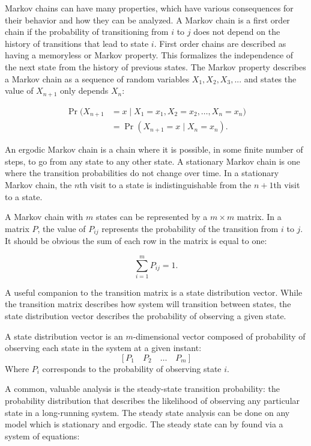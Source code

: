 Markov chains can have many properties, which have various consequences for their behavior and how they can be analyzed. A Markov chain is a first order chain if the probability of transitioning from $i$ to $j$ does not depend on the history of transitions that lead to state $i$.
First order chains are described as having a memoryless or Markov property.
This formalizes the independence of the next state from the history of previous states.
The Markov property describes a Markov chain as a sequence of random variables $X_{1}, X_{2}, X_{3}, ...$ and states the value of $X_{n+1}$ only depends $X_{n}$: \cite{MARKOV3}

\begin{align} \Pr(X_{n+1}&=x\mid X_1=x_1, X_2=x_2, \ldots, X_n=x_n)
\nonumber \\ &= \Pr(X_{n+1}=x\mid X_n=x_n). \end{align}

An ergodic Markov chain is a chain where it is possible, in some finite number of steps, to go from any state to any other state.
A stationary Markov chain is one where the transition probabilities do not change over time.
In a stationary Markov chain, the $n$th visit to a state is indistinguishable from the $n+1$th visit to a state.

A Markov chain with $m$ states can be represented by a $m\times m$ matrix.
In a matrix $P$, the value of $P_{ij}$ represents the probability of the transition from $i$ to $j$.
It should be obvious the sum of each row in the matrix is equal to one:

\begin{equation} \sum_{i=1}^{m} P_{ij} = 1. \end{equation}

A useful companion to the transition matrix is a state distribution vector.
While the transition matrix describes how system will transition between states, the state distribution vector describes the probability of observing a given state.

\begin{pdef}
A state distribution vector is an $m$-dimensional vector composed of probability of observing each state in the system at a given instant:
\[ [P_{1} \quad P_{2} \quad \ldots \quad P_{m} ] \]
Where $P_{i}$ corresponds to the probability of observing state $i$.
\end{pdef}

A common, valuable analysis is the steady-state transition probability: the probability distribution that describes the likelihood of observing any particular state in a long-running system. The steady state analysis can be done on any model which is stationary and ergodic. The steady state can by found via a system of equations: \cite{MARKOV3}

